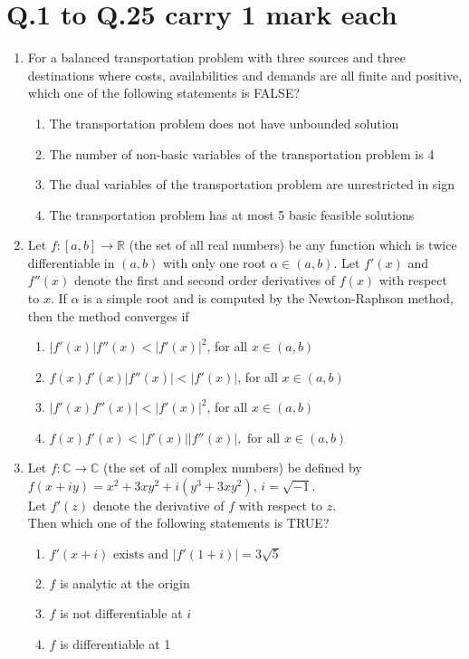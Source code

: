\documentclass[journal]{IEEEtran}
\numberwithin{equation}{enumi}
\numberwithin{figure}{enumi}
\begin{document}
    \section*{Q.1 to Q.25 carry 1 mark each}
    \begin{enumerate}
    \item For a balanced transportation problem with three sources and three destinations where costs, availabilities and demands are all finite and positive, which one of the following statements is FALSE?\\
    \begin{enumerate}
        \item The transportation problem does not have unbounded solution
        \item The number of non-basic variables of the transportation problem is 4
        \item The dual variables of the transportation problem are unrestricted in sign
        \item The transportation problem has at most 5 basic feasible solutions
    \end{enumerate}
    \bigskip

    \item Let $ f : [a,b] \to \mathbb{R} $ (the set of all real numbers) be any function which is twice differentiable in $ (a,b) $ with only one root $ \alpha \in (a,b) $. Let $ f' (x) $ and $ f''(x) $ denote the first and second order derivatives of $ f(x) $ with respect to $ x $. If $ \alpha $ is a simple root and is computed by the Newton-Raphson method, then the method converges if\\
    \begin{enumerate}
        \item $ |f' (x)| f''(x) < |f'(x)|^2 $, for all $ x \in (a,b) $
        \item $ f(x) f' (x) |f''(x)| < |f'(x)|$, for all $ x \in (a,b) $
        \item $ |f'(x) f''(x)| < |f'(x)|^2 $, for all $ x \in (a,b) $
        \item $ f(x) f' (x) < |f'(x)| |f''(x)|, \text{ for all } x \in (a,b) $
    \end{enumerate}
    \bigskip

    \item Let $ f : \mathbb{C} \to \mathbb{C} $ (the set of all complex numbers) be defined by\\
    $ f(x + iy) = x^2 + 3xy^2 + i(y^3 + 3xy^2) $, $ i = \sqrt{-1} $.\\
    Let $ f'(z) $ denote the derivative of $ f $ with respect to $ z $.\\
    Then which one of the following statements is TRUE?\\
    \begin{enumerate}
        \item $ f'(x + i) \text{ exists and } |f'(1+i)| = 3\sqrt{5} $
        \item $ f $ is analytic at the origin
        \item $ f $ is not differentiable at $ i $
        \item $ f $ is differentiable at 1
    \end{enumerate}
    \bigskip
\end{enumerate}
\end{document}
